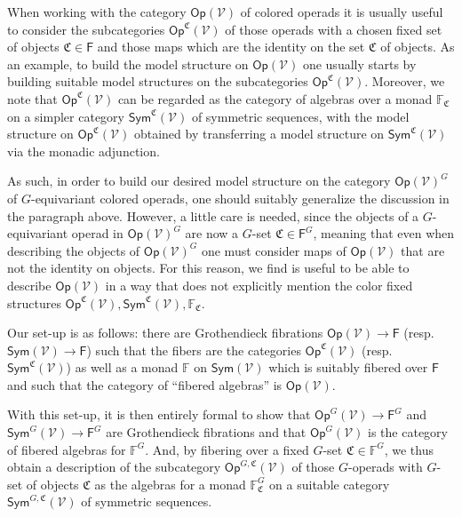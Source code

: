\documentclass[a4paper,10pt
,draft
]{article}%
\renewcommand{\1}{\eta}%
\begin{document}
When working with the category $\mathsf{Op}(\mathcal{V})$
of colored operads it is usually useful to consider the subcategories $\mathsf{Op}^{\mathfrak{C}}(\mathcal{V})$
of those operads with a chosen fixed set of objects
$\mathfrak{C} \in \mathsf{F}$ and those maps which are the identity on the set $\mathfrak{C}$ of objects.
As an example, to build the model structure on $\mathsf{Op}(\mathcal{V})$ one usually starts by building suitable model structures on the subcategories $\mathsf{Op}^{\mathfrak{C}}(\mathcal{V})$.
Moreover, we note that $\mathsf{Op}^{\mathfrak{C}}(\mathcal{V})$ can be regarded as the category of algebras over a monad 
$\mathbb{F}_{\mathfrak{C}}$ on a simpler category
$\mathsf{Sym}^{\mathfrak{C}}(\mathcal{V})$ of symmetric sequences, 
with the model structure on
$\mathsf{Op}^{\mathfrak{C}}(\mathcal{V})$
obtained by transferring a model structure on 
$\mathsf{Sym}^{\mathfrak{C}}(\mathcal{V})$
via the monadic adjunction.

As such, in order to build our desired model structure on the category $\mathsf{Op}(\mathcal{V})^G$ of $G$-equivariant colored operads, one should suitably generalize the discussion in the paragraph above.
However, a little care is needed, since the objects of a $G$-equivariant operad in $\mathsf{Op}(\mathcal{V})^G$ are now a $G$-set $\mathfrak{C} \in \mathsf{F}^G$, meaning that even when describing the objects of 
$\mathsf{Op}(\mathcal{V})^G$ one must consider maps of 
$\mathsf{Op}(\mathcal{V})$ that are not the identity on objects.
For this reason, we find is useful to be able to describe 
$\mathsf{Op}(\mathcal{V})$ 
in a way that does not explicitly mention the color fixed structures
$\mathsf{Op}^{\mathfrak{C}}(\mathcal{V}),
\mathsf{Sym}^{\mathfrak{C}}(\mathcal{V}),
\mathbb{F}_{\mathfrak{C}}$.

Our set-up is as follows: 
there are Grothendieck fibrations 
$\mathsf{Op}(\mathcal{V}) \to \mathsf{F}$
(resp. $\mathsf{Sym}(\mathcal{V}) \to \mathsf{F}$)
such that the fibers are the categories 
$\mathsf{Op}^{\mathfrak{C}}(\mathcal{V})$
(resp. $\mathsf{Sym}^{\mathfrak{C}}(\mathcal{V})$)
as well as a monad $\mathbb{F}$ on 
$\mathsf{Sym}(\mathcal{V})$ which is suitably fibered over $\mathsf{F}$
and such that the category of ``fibered algebras'' is 
$\mathsf{Op}(\mathcal{V})$.

With this set-up, it is then entirely formal to show that 
$\mathsf{Op}^G(\mathcal{V}) \to \mathsf{F}^G$
and
$\mathsf{Sym}^G(\mathcal{V}) \to \mathsf{F}^G$
are Grothendieck fibrations and that 
$\mathsf{Op}^G(\mathcal{V})$ is the category of fibered algebras for $\mathbb{F}^G$.
And, by fibering over a fixed $G$-set $\mathfrak{C} \in \mathbb{F}^G$,
we thus obtain a description of the subcategory 
$\mathsf{Op}^{G,\mathfrak{C}}(\mathcal{V})$
of those $G$-operads with $G$-set of objects $\mathfrak{C}$
as the algebras for a monad $\mathbb{F}^G_{\mathfrak{C}}$
on a suitable category $\mathsf{Sym}^{G,\mathfrak{C}}(\mathcal{V})$
of symmetric sequences.
\end{document}
